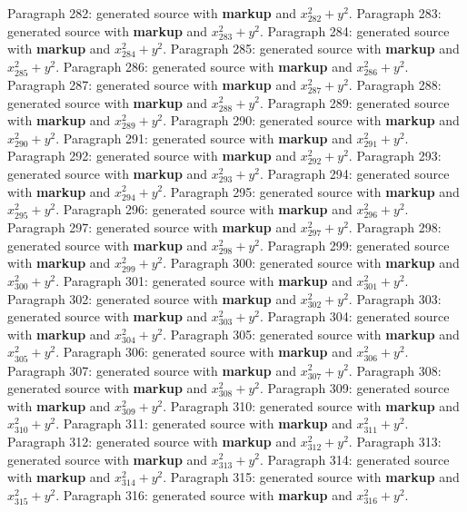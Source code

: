 \documentclass{article}
\begin{document}
Paragraph 282: generated source with \textbf{markup} and $x_{282}^2 + y^2$.
Paragraph 283: generated source with \textbf{markup} and $x_{283}^2 + y^2$.
Paragraph 284: generated source with \textbf{markup} and $x_{284}^2 + y^2$.
Paragraph 285: generated source with \textbf{markup} and $x_{285}^2 + y^2$.
Paragraph 286: generated source with \textbf{markup} and $x_{286}^2 + y^2$.
Paragraph 287: generated source with \textbf{markup} and $x_{287}^2 + y^2$.
Paragraph 288: generated source with \textbf{markup} and $x_{288}^2 + y^2$.
Paragraph 289: generated source with \textbf{markup} and $x_{289}^2 + y^2$.
Paragraph 290: generated source with \textbf{markup} and $x_{290}^2 + y^2$.
Paragraph 291: generated source with \textbf{markup} and $x_{291}^2 + y^2$.
Paragraph 292: generated source with \textbf{markup} and $x_{292}^2 + y^2$.
Paragraph 293: generated source with \textbf{markup} and $x_{293}^2 + y^2$.
Paragraph 294: generated source with \textbf{markup} and $x_{294}^2 + y^2$.
Paragraph 295: generated source with \textbf{markup} and $x_{295}^2 + y^2$.
Paragraph 296: generated source with \textbf{markup} and $x_{296}^2 + y^2$.
Paragraph 297: generated source with \textbf{markup} and $x_{297}^2 + y^2$.
Paragraph 298: generated source with \textbf{markup} and $x_{298}^2 + y^2$.
Paragraph 299: generated source with \textbf{markup} and $x_{299}^2 + y^2$.
Paragraph 300: generated source with \textbf{markup} and $x_{300}^2 + y^2$.
Paragraph 301: generated source with \textbf{markup} and $x_{301}^2 + y^2$.
Paragraph 302: generated source with \textbf{markup} and $x_{302}^2 + y^2$.
Paragraph 303: generated source with \textbf{markup} and $x_{303}^2 + y^2$.
Paragraph 304: generated source with \textbf{markup} and $x_{304}^2 + y^2$.
Paragraph 305: generated source with \textbf{markup} and $x_{305}^2 + y^2$.
Paragraph 306: generated source with \textbf{markup} and $x_{306}^2 + y^2$.
Paragraph 307: generated source with \textbf{markup} and $x_{307}^2 + y^2$.
Paragraph 308: generated source with \textbf{markup} and $x_{308}^2 + y^2$.
Paragraph 309: generated source with \textbf{markup} and $x_{309}^2 + y^2$.
Paragraph 310: generated source with \textbf{markup} and $x_{310}^2 + y^2$.
Paragraph 311: generated source with \textbf{markup} and $x_{311}^2 + y^2$.
Paragraph 312: generated source with \textbf{markup} and $x_{312}^2 + y^2$.
Paragraph 313: generated source with \textbf{markup} and $x_{313}^2 + y^2$.
Paragraph 314: generated source with \textbf{markup} and $x_{314}^2 + y^2$.
Paragraph 315: generated source with \textbf{markup} and $x_{315}^2 + y^2$.
Paragraph 316: generated source with \textbf{markup} and $x_{316}^2 + y^2$.
\end{document}
